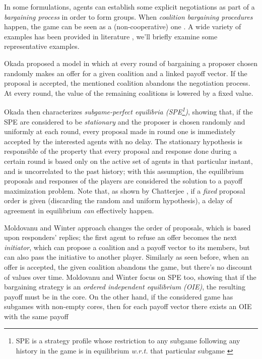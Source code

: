 \documentclass[11pt, twoside, titlepage, a4paper, openright]{report}
\begin{document}
In some formulations, agents can establish some explicit negotiations as part of a \textit{bargaining process} in order to form groups. When \textit{coalition bargaining procedures} happen, the game can be seen as a (non-cooperative) one \cite{RePEc:cla:levrem:814577000000000225,roger1991,mas1995microeconomic}. A wide variety of examples has been provided in literature \cite{RePEc:bla:restud:v:60:y:1993:i:2:p:463-77,RePEc:eee:gamebe:v:19:y:1997:i:2:p:211-220,RePEc:ecm:emetrp:v:64:y:1996:i:2:p:357-80,RePEc:eee:gamebe:v:9:y:1995:i:1:p:21-34,RePEc:eee:gamebe:v:16:y:1996:i:1:p:97-108,RePEc:ecm:emetrp:v:62:y:1994:i:4:p:795-817,RePEc:spr:sochwe:v:14:y:1997:i:4:p:513-525,springerlink:10.1007/s001820300137}, we'll briefly examine some representative examples.

Okada \cite{RePEc:eee:gamebe:v:16:y:1996:i:1:p:97-108} proposed a model in which at every round of bargaining a proposer chosen randomly makes an offer for a given coalition and a linked payoff vector. If the proposal is accepted, the mentioned coalition abandons the negotiation process. At every round, the value of the remaining coalitions is lowered by a fixed value. 

\noindent Okada then characterizes \textit{subgame-perfect equilibria (SPE\footnote{SPE is a strategy profile whose restriction to any subgame following any history in the game is in equilibrium \textit{w.r.t.} that particular subgame \cite{mas1995microeconomic,RePEc:cla:levrem:814577000000000225}})}, showing that, if the SPE are considered to be \textit{stationary} and the proposer is chosen randomly and uniformly at each round, every proposal made in round one is immediately accepted by the interested agents with no delay. The stationary hypothesis is responsible of the property that every proposal and response done during a certain round is based only on the active set of agents in that particular instant, and is uncorrelated to the past history; with this assumption, the equilibrium proposals and responses of the players are considered the solution to a payoff maximization problem. Note that, as shown by Chatterjee \cite{RePEc:bla:restud:v:60:y:1993:i:2:p:463-77}, if a \textit{fixed} proposal order is given (discarding the random and uniform hypothesis), a delay of agreement in equilibrium \textit{can} effectively happen.

Moldovanu and Winter \cite{RePEc:eee:gamebe:v:9:y:1995:i:1:p:21-34} approach changes the order of proposals, which is based upon responders' replies; the first agent to refuse an offer becomes the next \textit{initiator}, which can propose a coalition and a payoff vector to its members, but can also pass the initiative to another player. Similarly as seen before, when an offer is accepted, the given coalition abandons the game, but there's no discount of values over time. Moldovanu and Winter focus on SPE too, showing that if the bargaining strategy is an \textit{ordered independent equilibrium (OIE)}, the resulting payoff must be in the core. On the other hand, if the considered game has subgames with non-empty cores, then for each payoff vector there exists an OIE with the same payoff
\end{document}
